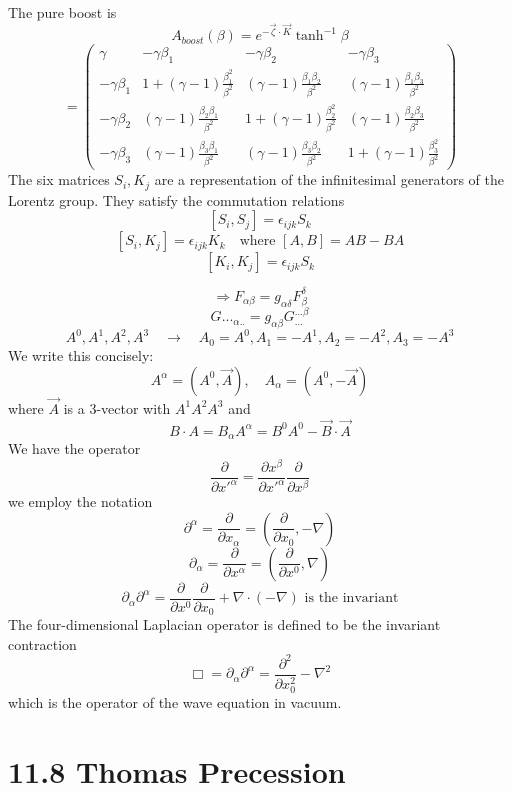 \documentclass{article}
\begin{document}
	The pure boost is
	\[
	A_{boost}(\beta) = e^{-\vec{\zeta} \cdot \vec{K}} \tanh^{-1} \beta
	\]
	\[
	= \begin{pmatrix}
		\gamma & -\gamma \beta_1 & -\gamma \beta_2 & -\gamma \beta_3 \\
		-\gamma \beta_1 & 1 + (\gamma-1)\frac{\beta_1^2}{\beta^2} & (\gamma-1)\frac{\beta_1 \beta_2}{\beta^2} & (\gamma-1)\frac{\beta_1 \beta_3}{\beta^2} \\
		-\gamma \beta_2 & (\gamma-1)\frac{\beta_2 \beta_1}{\beta^2} & 1 + (\gamma-1)\frac{\beta_2^2}{\beta^2} & (\gamma-1)\frac{\beta_2 \beta_3}{\beta^2} \\
		-\gamma \beta_3 & (\gamma-1)\frac{\beta_3 \beta_1}{\beta^2} & (\gamma-1)\frac{\beta_3 \beta_2}{\beta^2} & 1 + (\gamma-1)\frac{\beta_3^2}{\beta^2}
	\end{pmatrix}
	\]
	The six matrices $S_i, K_j$ are a representation of the infinitesimal generators of the Lorentz group.
	They satisfy the commutation relations
	\[
	[S_i, S_j] = \epsilon_{ijk} S_k
	\]
	\[
	[S_i, K_j] = \epsilon_{ijk} K_k \quad \text{where } [A,B] = AB-BA
	\]
	\[
	[K_i, K_j] = \epsilon_{ijk} S_k
	\]
	
	\newpage
	
	\[
	\Rightarrow F_{\alpha\beta} = g_{\alpha\delta} F^{\delta}_{\beta}
	\]
	\[
	G..._{\alpha..} = g_{\alpha\beta} G^{...\beta}_{...}
	\]
	\[
	A^0, A^1, A^2, A^3 \quad \rightarrow \quad A_0 = A^0, A_1 = -A^1, A_2 = -A^2, A_3 = -A^3
	\]
	We write this concisely:
	\[
	A^\alpha = (A^0, \vec{A}), \quad A_\alpha = (A^0, -\vec{A})
	\]
	where $\vec{A}$ is a 3-vector with $A^1 A^2 A^3$ and
	\[
	B \cdot A = B_\alpha A^\alpha = B^0 A^0 - \vec{B} \cdot \vec{A}
	\]
	We have the operator
	\[
	\frac{\partial}{\partial x'^\alpha} = \frac{\partial x^\beta}{\partial x'^\alpha} \frac{\partial}{\partial x^\beta}
	\]
	we employ the notation
	\[
	\partial^\alpha = \frac{\partial}{\partial x_\alpha} = (\frac{\partial}{\partial x_0}, -\nabla)
	\]
	\[
	\partial_\alpha = \frac{\partial}{\partial x^\alpha} = (\frac{\partial}{\partial x^0}, \nabla)
	\]
	\[
	\partial_\alpha \partial^\alpha = \frac{\partial}{\partial x^0} \frac{\partial}{\partial x_0} + \nabla \cdot (-\nabla) \text{ is the invariant}
	\]
	The four-dimensional Laplacian operator is defined to be the invariant contraction
	\[
	\Box = \partial_\alpha \partial^\alpha = \frac{\partial^2}{\partial x_0^2} - \nabla^2
	\]
	which is the operator of the wave equation in vacuum.
	\section*{11.8 Thomas Precession}
	
\end{document}
